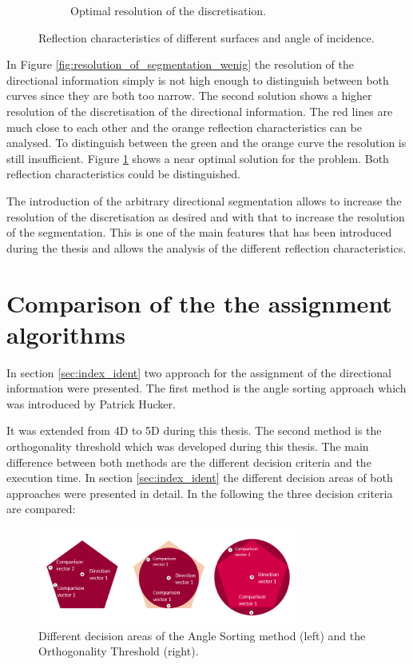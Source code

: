 \begin{figure}[H]
\begin{subfigure}[b]{0.32\textwidth}
         \caption{Optimal resolution of the discretisation.}
         \label{fig:resolution_of_segmentation_gut}
     \end{subfigure}
        \caption{Reflection characteristics of different surfaces and angle of incidence.}
        \label{fig:resolution_of_segmentation}
\end{figure}


In Figure \ref{fig:resolution_of_segmentation_wenig} the resolution of the directional information simply is not high enough to distinguish between both curves since they are both too narrow. The second solution shows a higher resolution of the discretisation of the directional information. The red lines are much close to each other and the orange reflection characteristics can be analysed. To distinguish between the green and the orange curve the resolution is still insufficient. Figure \ref{fig:resolution_of_segmentation_gut} shows a near optimal solution for the problem. Both reflection characteristics could be distinguished. 

The introduction of the arbitrary directional segmentation allows to increase the resolution of the discretisation as desired and with that to increase the resolution of the segmentation. This is one of the main features that has been introduced during the thesis and allows the analysis of the different reflection characteristics. 






\section{ Comparison of the the assignment algorithms}
In section \ref{sec:index_ident} two approach for the assignment of the directional information were presented. The first method is the angle sorting approach which was introduced by Patrick Hucker.

It was extended from 4D to 5D during this thesis. The second method is the orthogonality threshold which was developed during this thesis. The main difference between both methods are the different decision criteria and the execution time. In section \ref{sec:index_ident} the different decision areas of both approaches were presented in detail. In the following the three decision criteria are compared:

\begin{figure}[H]
    \centering
    \includegraphics[width=0.76\textwidth]{Graphics/different_quality_assignment.png}
    \caption{Different decision areas of the Angle Sorting method (left) and the Orthogonality Threshold (right). }
    \label{angle_assignment_quality}
\end{figure}

